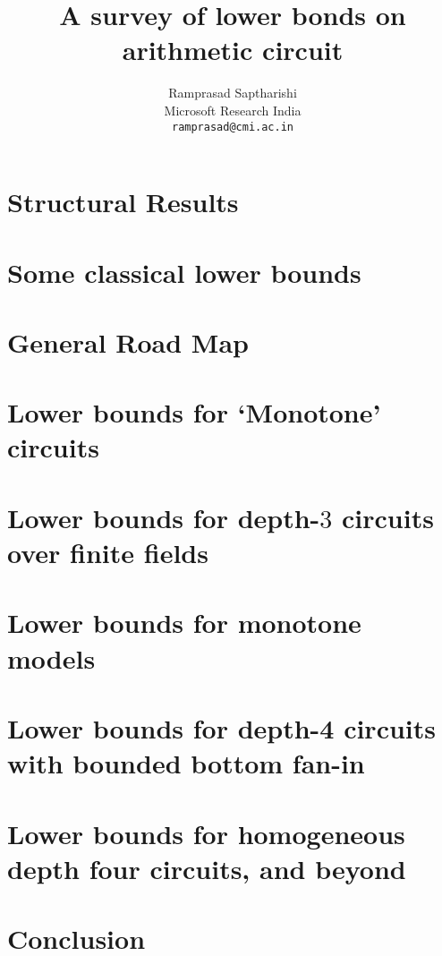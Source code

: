 \documentclass[12pt]{report}
\begin{document}
\title{A survey of lower bonds on arithmetic circuit}
\author{Ramprasad Saptharishi\\Microsoft Research India\\
{\tt ramprasad@cmi.ac.in}}
\maketitle 

\begin{abstract}
\lipsum[1-2]
\end{abstract}

\tableofcontents







\chapter{Structural Results}

\chapter{Some classical lower bounds}

\chapter{General Road Map}

\chapter{Lower bounds for `Monotone' circuits}

\chapter{Lower bounds for depth-$3$ circuits over finite fields}

\chapter{Lower bounds for monotone models}

\chapter{Lower bounds for depth-4 circuits with bounded bottom fan-in}

\chapter{Lower bounds for homogeneous depth four circuits, and beyond}

\chapter{Conclusion}




\end{document}
